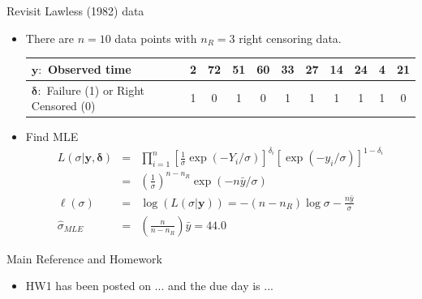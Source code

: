 \documentclass{beamer}
\begin{document}
    \begin{frame}{Revisit Lawless (1982) data}
        \begin{itemize}
            \item There are $n = 10$ data points with $n_{R} = 3$ right censoring data.
            \begin{small}
            \begin{table}
            \begin{tabular}{|p{3 cm}|c|c|c|c|c|c|c|c|c|c|}
                \hline
                $\boldsymbol{y}:$ Observed time & 2 & 72 & 51 & 60 & 33 & 27 & 14 & 24 & 4 & 21 \nonumber\\
                \hline
                $\boldsymbol{\delta}:$ Failure (1) or Right Censored (0) & 1 & 0 & 1 & 0 & 1 & 1 & 1 & 1 & 1 & 0 \nonumber\\
                 \hline
            \end{tabular}
            \end{table}
            \end{small}
            \item Find MLE
            \begin{eqnarray}
            L(\sigma|\boldsymbol{y}, \boldsymbol{\delta}) & = & \prod^{n}_{i=1}\left[\frac{1}{\sigma}\exp(-Y_{i}/\sigma)\right]^{\delta_{i}} \left[\exp(-y_{i}/\sigma)\right]^{1-\delta_{i}} \nonumber\\
            & = & \left(\frac{1}{\sigma}\right)^{n-n_{R}}\exp(-n\bar{y}/\sigma) \nonumber\\
        \ell (\sigma)    & = & \log(L(\sigma|\boldsymbol{y})) = -(n-n_{R})\log \sigma - \frac{n\bar{y}}{\sigma} \nonumber\\
        \hat{\sigma}_{MLE} & = & \left(\frac{n}{n-n_{R}}\right)\bar{y} = 44.0 \nonumber
            \end{eqnarray}
        \end{itemize}
    \end{frame}


    \begin{frame}{ Main Reference and Homework}
        \begin{itemize}
            \item HW1 has been posted on ... and the due day is ...
        \end{itemize}
    \end{frame}
\end{document}
